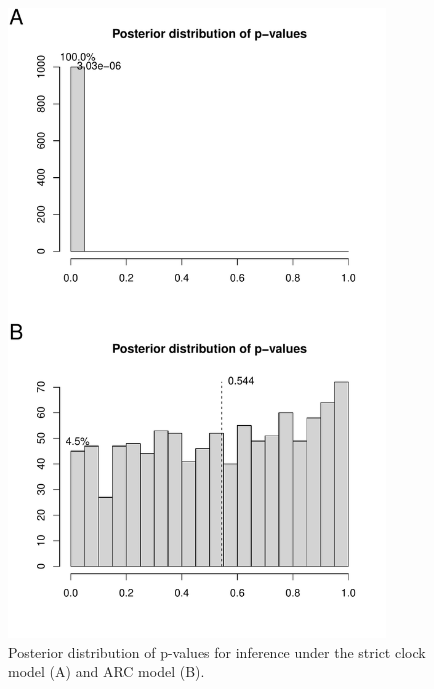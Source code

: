 \documentclass{article}
\begin{document}
\begin{figure}[t!]
\begin{center}
\includegraphics[width=10cm]{exampleS2.pdf}
\end{center}
\caption{Posterior distribution of p-values for inference under the strict clock model (A) and ARC model (B).
\label{fig:exampleS2}}
\end{figure}
\end{document}
